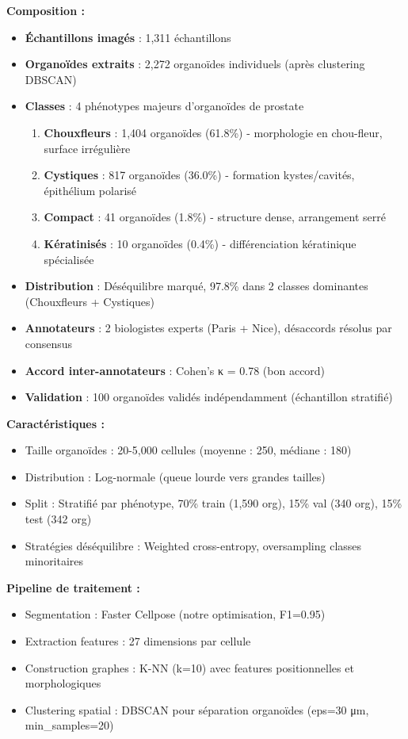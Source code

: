 \textbf{Composition :}
\begin{itemize}
    \item \textbf{Échantillons imagés} : 1,311 échantillons
    \item \textbf{Organoïdes extraits} : 2,272 organoïdes individuels (après clustering DBSCAN)
    \item \textbf{Classes} : 4 phénotypes majeurs d'organoïdes de prostate
    \begin{enumerate}
        \item \textbf{Chouxfleurs} : 1,404 organoïdes (61.8\%) - morphologie en chou-fleur, surface irrégulière
        \item \textbf{Cystiques} : 817 organoïdes (36.0\%) - formation kystes/cavités, épithélium polarisé
        \item \textbf{Compact} : 41 organoïdes (1.8\%) - structure dense, arrangement serré
        \item \textbf{Kératinisés} : 10 organoïdes (0.4\%) - différenciation kératinique spécialisée
    \end{enumerate}
    \item \textbf{Distribution} : Déséquilibre marqué, 97.8\% dans 2 classes dominantes (Chouxfleurs + Cystiques)
    \item \textbf{Annotateurs} : 2 biologistes experts (Paris + Nice), désaccords résolus par consensus
    \item \textbf{Accord inter-annotateurs} : Cohen's κ = 0.78 (bon accord)
    \item \textbf{Validation} : 100 organoïdes validés indépendamment (échantillon stratifié)
\end{itemize}

\textbf{Caractéristiques :}
\begin{itemize}
    \item Taille organoïdes : 20-5,000 cellules (moyenne : 250, médiane : 180)
    \item Distribution : Log-normale (queue lourde vers grandes tailles)
    \item Split : Stratifié par phénotype, 70\% train (1,590 org), 15\% val (340 org), 15\% test (342 org)
    \item Stratégies déséquilibre : Weighted cross-entropy, oversampling classes minoritaires
\end{itemize}

\textbf{Pipeline de traitement :}
\begin{itemize}
    \item Segmentation : Faster Cellpose (notre optimisation, F1=0.95)
    \item Extraction features : 27 dimensions par cellule
    \item Construction graphes : K-NN (k=10) avec features positionnelles et morphologiques
    \item Clustering spatial : DBSCAN pour séparation organoïdes (eps=30 μm, min\_samples=20)
\end{itemize}

